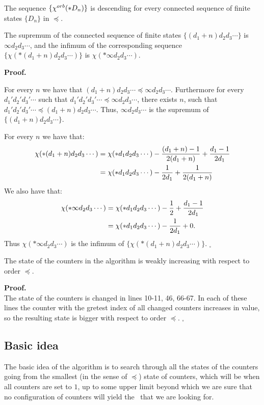 \begin{corollary}\label{connected sequences corollary}
The sequence $\{{\chi^{orb}(*D_n)}\}$ is descending for every connected sequence 
of finite states $\{D_n\}$ in $\preceq$. 
\end{corollary}
\begin{lemma}\label{chi supp functoriality}
The supremum of the connected sequence 
of finite states $\{(d_1+n)d_2d_3\cdots\}$ is $\infty d_2d_3\cdots$, and 
the infimum of the corresponding sequence $\{\chi(*(d_1+n)d_2d_3\cdots)\}$ is  
$\chi(*\infty d_2d_3\cdots)$.
\end{lemma}
\textbf{Proof.} 

For every $n$ we have that $(d_1+n)d_2d_3\cdots\preceq\infty d_2d_3\cdots$. Furthermore for 
every $d_1'd_2'd_3'\cdots$ such that $d_1'd_2'd_3'\cdots\preceq \infty d_2d_3\cdots$, there 
exists $n$, such that $d_1'd_2'd_3' \cdots\preceq(d_1+n)d_2d_3\cdots$. Thus, $\infty d_2d_3\cdots$ 
is the supremum of $\{(d_1+n)d_2d_3\cdots\}$.

For every $n$ we have that: 
\begin{align}
\chi(*(d_1+n)d_2d_3\cdots) &= \chi(*d_1d_2d_3\cdots) 
- \frac{(d_1+n)-1}{2(d_1+n)} + \frac{d_1-1}{2d_1} \notag\\ 
&= \chi(*d_1d_2d_3\cdots) - \frac{1}{2d_1} + \frac{1}{2(d_1+n)}
\end{align}
We also have that:
\begin{align}
\chi(*\infty d_2d_3\cdots) &= \chi(*d_1d_2d_3\cdots) 
- \frac{1}{2} + \frac{d_1-1}{2d_1} \notag\\ 
&= \chi(*d_1d_2d_3\cdots) - \frac{1}{2d_1} + 0.
\end{align}
Thus $\chi(*\infty d_2d_3\cdots)$ is the infimum of $\{\chi(*(d_1+n)d_2d_3\cdots)\}$.
$_\square$

\begin{lemma}
The state of the counters in the algorithm is weakly increasing with respect to order $\preceq$. 
\end{lemma}
\textbf{Proof.} \\
The state of the counters is changed in lines 10-11, 46, 66-67. In each of these lines 
the counter with the gretest index of all changed counters increases in value, so 
the resulting state is bigger with respect to order $\preceq$. $_\square$

\subsection{Basic idea}
The basic idea of the algorithm is to search through all the states of the counters going 
from the smallest (in the sense of $\preceq$) state of counters, which will be when all counters 
are set to $1$, up to some upper limit beyond which we are sure that no configuration of 
counters will yield the \Eoc\ that we are looking for. 

